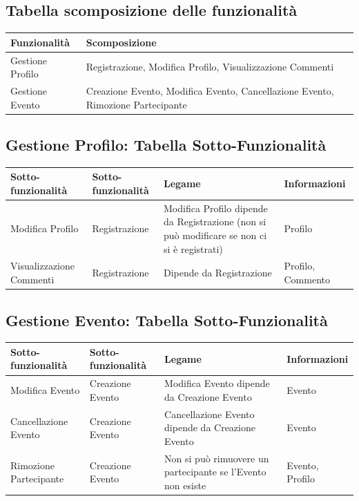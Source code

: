 \documentclass[12pt,a4paper]{report}
\begin{document}
\subsection{Tabella scomposizione delle funzionalità}
\begin{tabularx}{\textwidth}{|X|X|}
    \hline
    \rowcolor{studyColor} \textbf{Funzionalità} & \textbf{Scomposizione} \\ \hline
    \endhead
    Gestione Profilo & Registrazione, Modifica Profilo, Visualizzazione Commenti \\ \hline
    Gestione Evento & Creazione Evento, Modifica Evento, Cancellazione Evento, Rimozione Partecipante \\ \hline
\end{tabularx}

\subsection{Gestione Profilo: Tabella Sotto-Funzionalità}
\begin{tabularx}{\textwidth}{|X|X|X|X|}
    \hline
    \rowcolor{studyColor} \textbf{Sotto-funzionalità} & \textbf{Sotto-funzionalità} & \textbf{Legame} & \textbf{Informazioni} \\ \hline
    \endhead
    Modifica Profilo & Registrazione & Modifica Profilo dipende da Registrazione (non si può modificare se non ci si è registrati) & Profilo \\ \hline
    Visualizzazione Commenti & Registrazione & Dipende da Registrazione & Profilo, Commento \\ \hline
\end{tabularx}

\subsection{Gestione Evento: Tabella Sotto-Funzionalità}
\begin{tabularx}{\textwidth}{|X|X|X|X|}
    \hline
    \rowcolor{studyColor} \textbf{Sotto-funzionalità} & \textbf{Sotto-funzionalità} & \textbf{Legame} & \textbf{Informazioni} \\ \hline
    \endhead
    Modifica Evento & Creazione Evento & Modifica Evento dipende da Creazione Evento & Evento \\ \hline
    Cancellazione Evento & Creazione Evento & Cancellazione Evento dipende da Creazione Evento & Evento \\ \hline
    Rimozione Partecipante & Creazione Evento & Non si può rimuovere un partecipante se l'Evento non esiste & Evento, Profilo \\ \hline
\end{tabularx}
\end{document}
